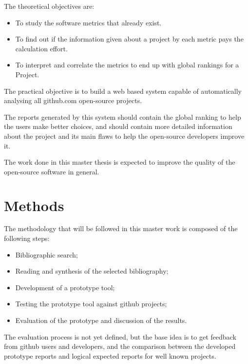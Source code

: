 \documentclass[12pt]{article}
\begin{document}
The theoretical objectives are:
\begin{itemize}
\item To study the software metrics that already exist.
\item To find out if the information given about a project by each metric pays the calculation effort. 
\item To interpret and correlate the metrics to end up with global rankings for a Project.
\end{itemize}  

The practical objective is to build a web based system capable of automatically analysing all github.com open-source projects.

\medskip

The reports generated by this system should contain the global ranking to help the users make better choices, and should contain more detailed information about the project and its main flaws to help the open-source developers improve it. 

The work done in this master thesis is expected to improve the quality of the open-source software in general.



\section{Methods}
The methodology that will be followed in this master work is 
composed of the following steps:

\begin{itemize}
\item Bibliographic search;
\item Reading and synthesis of the selected bibliography;
\item Development of a prototype tool;
\item Testing the prototype tool against github projects;
\item Evaluation of the prototype and discussion of the results. 
\end{itemize}  

The evaluation process is not yet defined, but the base idea is to get feedback from github users and developers, and the comparison between the developed prototype reports and logical expected reports for well known projects.


\end{document}
